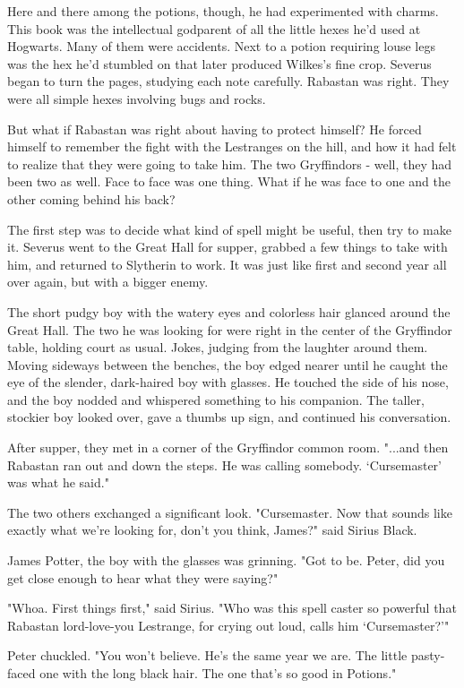 \documentclass[a4paper,11pt]{article}
\begin{document}
Here and there among the potions, though, he had experimented with charms. This book was the intellectual godparent of all the little hexes he'd used at Hogwarts. Many of them were accidents. Next to a potion requiring louse legs was the hex he'd stumbled on that later produced Wilkes's fine crop. Severus began to turn the pages, studying each note carefully. Rabastan was right. They were all simple hexes involving bugs and rocks.

But what if Rabastan was right about having to protect himself? He forced himself to remember the fight with the Lestranges on the hill, and how it had felt to realize that they were going to take him. The two Gryffindors - well, they had been two as well. Face to face was one thing. What if he was face to one and the other coming behind his back?

The first step was to decide what kind of spell might be useful, then try to make it. Severus went to the Great Hall for supper, grabbed a few things to take with him, and returned to Slytherin to work. It was just like first and second year all over again, but with a bigger enemy.

The short pudgy boy with the watery eyes and colorless hair glanced around the Great Hall. The two he was looking for were right in the center of the Gryffindor table, holding court as usual. Jokes, judging from the laughter around them. Moving sideways between the benches, the boy edged nearer until he caught the eye of the slender, dark-haired boy with glasses. He touched the side of his nose, and the boy nodded and whispered something to his companion. The taller, stockier boy looked over, gave a thumbs up sign, and continued his conversation.

After supper, they met in a corner of the Gryffindor common room. "...and then Rabastan ran out and down the steps. He was calling somebody. `Cursemaster' was what he said."

The two others exchanged a significant look. "Cursemaster. Now that sounds like exactly what we're looking for, don't you think, James?" said Sirius Black.

James Potter, the boy with the glasses was grinning. "Got to be. Peter, did you get close enough to hear what they were saying?"

"Whoa. First things first," said Sirius. "Who was this spell caster so powerful that Rabastan lord-love-you Lestrange, for crying out loud, calls him `Cursemaster?'"

Peter chuckled. "You won't believe. He's the same year we are. The little pasty-faced one with the long black hair. The one that's so good in Potions."
\end{document}

